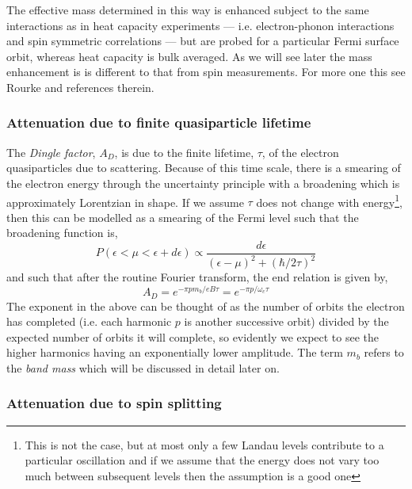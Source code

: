 The effective mass determined in this way is enhanced subject to the same interactions as in heat capacity experiments --- i.e. electron-phonon interactions and spin symmetric correlations --- but are probed for a particular Fermi surface orbit, whereas heat capacity is bulk averaged. As we will see later the mass enhancement is is different to that from spin measurements. For more one this see Rourke \etal\cite{Rourke2010b} and references therein.

\subsubsection{Attenuation due to finite quasiparticle lifetime}

The \textit{Dingle factor}, $A_D$, is due to the finite lifetime, $\tau$, of the electron quasiparticles due to scattering. Because of this time scale, there is a smearing of the electron energy through the uncertainty principle with a broadening which is approximately Lorentzian in shape. If we assume $\tau$ does not change with energy\footnote{This is not the case, but at most only a few Landau levels contribute to a particular oscillation and if we assume that the energy does not vary too much between subsequent levels then the assumption is a good one}, then this can be modelled as a smearing of the Fermi level such that the broadening function is,
\begin{equation}
  P(\epsilon < \mu < \epsilon + d\epsilon) \propto \frac{d\epsilon}{(\epsilon - \mu)^2 + (\hbar/2\tau)^2}
\end{equation}
and such that after the routine Fourier transform, the end relation is given by,
\begin{equation}
  A_D = e^{-\pi p m_b/e B\tau} = e^{-\pi p/\omega_c\tau} 
\label{Eqn:Theo:DingleTerm}
\end{equation}
The exponent in the above can be thought of as the number of orbits the electron has completed (i.e. each harmonic $p$ is another successive orbit) divided by the expected number of orbits it will complete, so evidently we expect to see the higher harmonics having an exponentially lower amplitude. The term $m_b$ refers to the \textit{band mass} which will be discussed in detail later on. 

\subsubsection{Attenuation due to spin splitting}

